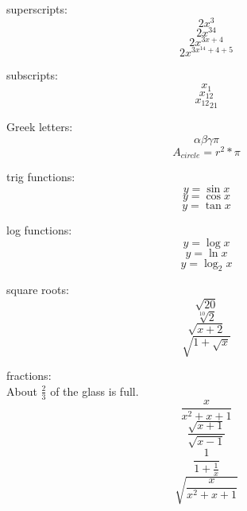 \documentclass[11]{article}
\begin{document}
superscripts: 
$$ 2x^3 $$ %
$$ 2x^{34} $$ %
$$ 2x^{ 3x + 4} $$
$$ 2x^{ 3x^{14} + 4 + 5} $$ %

subscripts: 
$$ x_1 $$
$$ x_{12} $$
$$ {x_{12}}_{21} $$ %

Greek letters: 
$$ \alpha \beta \gamma \pi $$ %
$$ A_{circle} = r^2 * \pi $$

trig functions: 
$$ y = \sin{x} $$
$$ y = \cos{x} $$
$$ y = \tan{x} $$

log functions: 
$$ y = \log{x} $$
$$ y = \ln{x} $$
$$ y = \log_2{x} $$ %

square roots: 
$$ \sqrt{20} $$
$$ \sqrt[10]{2} $$
$$ \sqrt{x + 2} $$
$$ \sqrt{1 + \sqrt{x}} $$ %

fractions:\\ 
About $\displaystyle{\frac{2}{3}} $ of the glass is full. %
$$ \frac{x}{x^2 + x + 1} $$
$$ \frac{ \sqrt{ x + 1}}{\sqrt{x - 1}} $$
$$ \frac{1}{1 + \frac{1}{x}} $$
$$ \sqrt{\frac{x}{x^2 + x + 1}} $$
\end{document}
